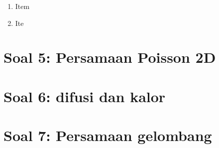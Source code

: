 \documentclass[12pt]{article}
\begin{document}
\begin{enumerate}[label=(\alph*)]
\item Item
\item Ite
\end{enumerate}


\section{Soal 5: Persamaan Poisson 2D}



\section{Soal 6: difusi dan kalor}




\section{Soal 7: Persamaan gelombang}



%
%
%
%
%
%
%
\end{document}
